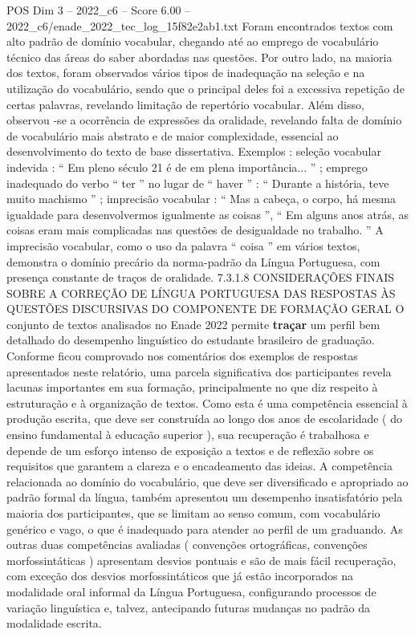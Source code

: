 \begin{textsample}{POS Dim 3 – 2022\_c6 – Score 6.00 – 2022\_c6/enade\_2022\_tec\_log\_15f82e2ab1.txt}
Foram encontrados textos com alto padrão de domínio vocabular, chegando até ao emprego de vocabulário técnico das áreas do saber abordadas nas questões.
Por outro lado, na maioria dos textos, foram observados vários tipos de inadequação na seleção e na utilização do vocabulário, sendo que o principal deles foi a excessiva repetição de certas palavras, revelando limitação de repertório vocabular.
Além disso, observou -se a ocorrência de expressões da oralidade, revelando falta de domínio de vocabulário mais abstrato e de maior complexidade, essencial ao desenvolvimento do texto de base dissertativa.
Exemplos : seleção vocabular indevida : “ Em pleno século 21 é de em plena importância... ” ; emprego inadequado do verbo “ ter ” no lugar de “ haver ” : “ Durante a história, teve muito machismo ” ; imprecisão vocabular : “ Mas a cabeça, o corpo, há mesma igualdade para desenvolvermos igualmente as coisas ”, “ Em alguns anos atrás, as coisas eram mais complicadas nas questões de desigualdade no trabalho. ” A imprecisão vocabular, como o uso da palavra “ coisa ” em vários textos, demonstra o domínio precário da norma-padrão da Língua Portuguesa, com presença constante de traços de oralidade. 7.3.1.8 CONSIDERAÇÕES FINAIS SOBRE A CORREÇÃO DE LÍNGUA PORTUGUESA DAS RESPOSTAS ÀS QUESTÕES DISCURSIVAS DO COMPONENTE DE FORMAÇÃO GERAL O conjunto de textos analisados no Enade 2022 permite \textbf{traçar} um perfil bem detalhado do desempenho linguístico do estudante brasileiro de graduação.
Conforme ficou comprovado nos comentários dos exemplos de respostas apresentados neste relatório, uma parcela significativa dos participantes revela lacunas importantes em sua formação, principalmente no que diz respeito à estruturação e à organização de textos.
Como esta é uma competência essencial à produção escrita, que deve ser construída ao longo dos anos de escolaridade ( do ensino fundamental à educação superior ), sua recuperação é trabalhosa e depende de um esforço intenso de exposição a textos e de reflexão sobre os requisitos que garantem a clareza e o encadeamento das ideias.
A competência relacionada ao domínio do vocabulário, que deve ser diversificado e apropriado ao padrão formal da língua, também apresentou um desempenho insatisfatório pela maioria dos participantes, que se limitam ao senso comum, com vocabulário genérico e vago, o que é inadequado para atender ao perfil de um graduando.
As outras duas competências avaliadas ( convenções ortográficas, convenções morfossintáticas ) apresentam desvios pontuais e são de mais fácil recuperação, com exceção dos desvios morfossintáticos que já estão incorporados na modalidade oral informal da Língua Portuguesa, configurando processos de variação linguística e, talvez, antecipando futuras mudanças no padrão da modalidade escrita.

\end{textsample}

